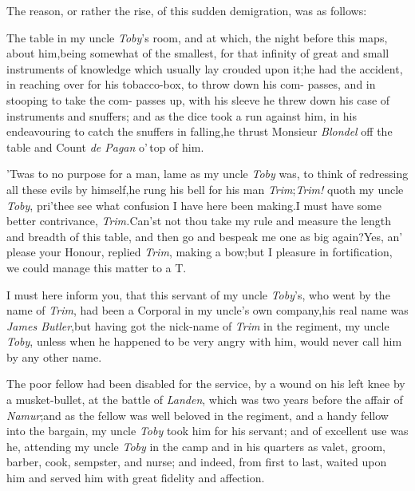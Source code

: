 \documentclass{article}
\begin{document}
The reason, or rather the rise, of this sudden demigration, was as
follows:

The table in my uncle \textit{Toby}’s room, and at which,
the night before this\break 
{}
maps, \etc about him,\tsk being somewhat\break
of the smallest, for that infinity of great\break
and small instruments of knowledge\break
which usually lay crouded upon it;\tsk he\break
had the accident, in reaching over for\break
his tobacco-box, to throw down his com-\break
passes, and in stooping to take the com-\break
passes up, with his sleeve he threw down\break
his case of instruments and snuffers;\tsk\break
and as the dice took a run against him,\break
in his endeavouring to catch the snuffers in
falling,\tsh he thrust Monsieur \textit{Blondel} off the
table and Count \textit{de Pagan} o’\,top of him.

’Twas to no purpose for a man, lame as my uncle
\textit{Toby} was, to think of redres\-sing all these evils by
himself,\tsk he rung his bell for his man
\textit{Trim};\tsk \textit{Trim!} quoth my uncle \textit{Toby},
pri’thee see what
confusion I have here been making.\tsk I must have some better
contrivance, \textit{Trim.}\tsk\break Can’st not thou take my rule
and measure the length and breadth of this table, and then go and
bespeak me one as big again?\tsh Yes, an’ please
your \hbox{Honour,} replied \textit{Trim}, making a bow;\tsk but I\break 
{}
pleasure in
fortification, we could ma\-nage this matter to a T.\\

\newpage
I must here inform you, that this servant of my uncle
\textit{Toby}’s, who went by the name of \textit{Trim}, had been
a Corporal\break
in my uncle’s own company,\tsh his real name was
\textit{James Butler},\tsk but having got the nick-name of
\textit{Trim} in the regiment, my uncle \textit{Toby}, unless when he
happened to be very angry with him, would never call him by any
other name.

The poor fellow had been disabled\break
for the service, by a
wound on his left knee by a musket-bullet, at the battle of
\textit{Landen}, which was two years before the affair of
\textit{Namur};\tsk and as the fellow was well beloved in
the regiment, and a\break
handy fellow into the bargain, my uncle \textit{Toby} took
him for his servant; and of excellent use was he, attending
my uncle \textit{Toby} in the camp and in his quarters as
valet, groom, barber, cook, sempster, and nurse; and
indeed, from first to last, waited upon him and served him
with great fidelity and affection.
\end{document}

